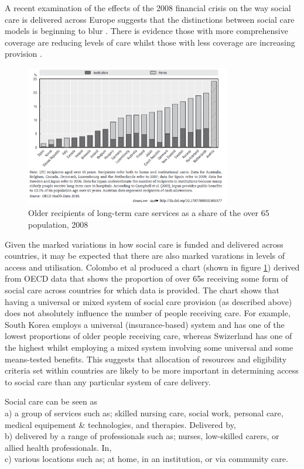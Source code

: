 \documentclass[12pt,]{report}
\begin{document}
A recent examination of the effects of the 2008 financial crisis on the
way social care is delivered across Europe suggests that the
distinctions between social care models is beginning to blur
\citep{RN343}. There is evidence those with more comprehensive coverage
are reducing levels of care whilst those with less coverage are
increasing provision \citep{RN414}.

\begin{figure}
  \centering
  \caption{Older recipients of long-term care services as a share of the over 65 population, 2008}
  \label{fig:oecd-comparison}
    \includegraphics[width=0.8\textwidth]{figures/oecd-comparison.PNG}
\end{figure}

Given the marked variations in how social care is funded and delivered
across countries, it may be expected that there are also marked
varations in levels of access and utilisation. Colombo et al
\citeyearpar{RN414} produced a chart (shown in figure
\ref{fig:oecd-comparison}) derived from OECD data that shows the
proportion of over 65s receiving some form of social care across
countries for which data is provided. The chart shows that having a
universal or mixed system of social care provision (as described above)
does not absolutely influence the number of people receiving care. For
example, South Korea employs a universal (insurance-based) system and
has one of the lowest proportions of older people receiving care,
whereas Swizerland has one of the highest whilst employing a mixed
system involving some universal and some means-tested benefits. This
suggests that allocation of resources and eligibility criteria set
within countries are likely to be more important in determining access
to social care than any particular system of care delivery.

Social care can be seen as\\
a) a group of services such as; skilled nursing care, social work,
personal care, medical equipement \& technologies, and therapies.
Delivered by,\\
b) delivered by a range of professionals such as; nurses, low-skilled
carers, or allied health professionals. In,\\
c) various locations such as; at home, in an institution, or via
community care.
\end{document}
